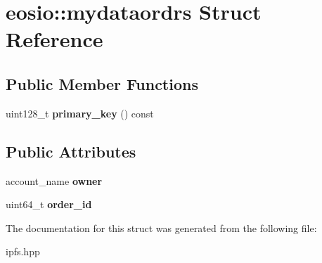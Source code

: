 \hypertarget{structeosio_1_1mydataordrs}{}\section{eosio\+:\+:mydataordrs Struct Reference}
\label{structeosio_1_1mydataordrs}
\subsection*{Public Member Functions}
\begin{DoxyCompactItemize}
\item 
\mbox{\label{structeosio_1_1mydataordrs_a7118c46f514606bf57b619b7f319cda3}} 
uint128\+\_\+t {\bfseries primary\+\_\+key} () const
\end{DoxyCompactItemize}
\subsection*{Public Attributes}
\begin{DoxyCompactItemize}
\item 
\mbox{\label{structeosio_1_1mydataordrs_a7a6d45976b335464cf308b977cf910dd}} 
account\+\_\+name {\bfseries owner}
\item 
\mbox{\label{structeosio_1_1mydataordrs_adcca7d379b327191c89311af7588a4e6}} 
uint64\+\_\+t {\bfseries order\+\_\+id}
\end{DoxyCompactItemize}


The documentation for this struct was generated from the following file\+:\begin{DoxyCompactItemize}
\item 
ipfs.\+hpp\end{DoxyCompactItemize}
